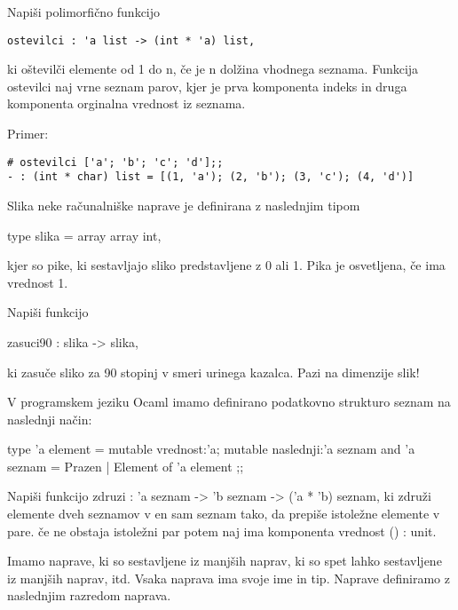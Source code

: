 \begin{ex}
\end{ex} \begin{ex}
Napi\v si polimorfi\v cno funkcijo 
\begin{verbatim}
ostevilci : 'a list -> (int * 'a) list, 
\end{verbatim}
ki o\v stevil\v ci elemente od 1 do n, \v ce je n dol\v zina vhodnega seznama. Funkcija ostevilci naj vrne seznam parov, kjer je prva komponenta indeks in druga komponenta orginalna vrednost iz seznama.

Primer:

\begin{verbatim}
# ostevilci ['a'; 'b'; 'c'; 'd'];; 
- : (int * char) list = [(1, 'a'); (2, 'b'); (3, 'c'); (4, 'd')]

\end{verbatim}

\end{ex} \begin{ex}
Slika neke ra\v cunalni\v ske naprave je definirana z naslednjim tipom 

type slika = array array int,

kjer so pike, ki sestavljajo sliko predstavljene z 0 ali 1. Pika je osvetljena, \v ce ima 
vrednost 1. 

Napi\v si funkcijo 

zasuci90 : slika -> slika, 

ki zasu\v ce sliko za 90 stopinj v smeri urinega kazalca. Pazi na dimenzije slik! 


\end{ex} \begin{ex}
V programskem jeziku Ocaml imamo definirano podatkovno strukturo seznam na 
naslednji na\v cin: 

type 'a element = { 
   mutable vrednost:'a; 
   mutable naslednji:'a seznam 
} 
and 'a seznam = Prazen | Element of 'a element ;; 

Napi\v si funkcijo zdruzi : 'a seznam -> 'b seznam -> ('a * 'b) seznam, ki zdru\v zi elemente dveh seznamov v en sam seznam tako, da prepi\v se istole\v zne elemente v  pare. \v ce ne obstaja istole\v zni par potem naj ima komponenta vrednost () : unit.

 
\end{ex} \begin{ex}
Imamo naprave, ki so sestavljene iz manj\v sih naprav, ki so spet lahko 
sestavljene iz manj\v sih naprav, itd. Vsaka naprava ima svoje ime in tip. Naprave definiramo z naslednjim razredom naprava. 


\end{ex}
